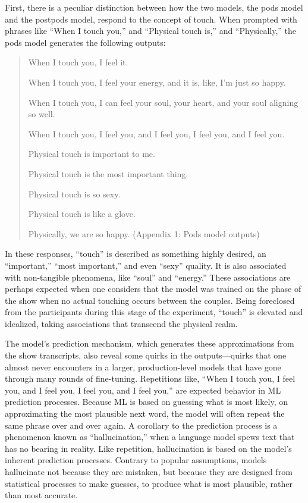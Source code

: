 \documentclass[11pt]{article}
\begin{document}
First, there is a peculiar distinction between how the two models, the
pods model and the postpods model, respond to the concept of touch.
When prompted with phrases like “When I touch you,” and “Physical
touch is,” and “Physically,” the pods model generates the following
outputs:

\begin{quote}
When I touch you, I feel it.

When I touch you, I feel your energy, and it is, like, I’m just so
happy.

When I touch you, I can feel your soul, your heart, and your soul
aligning so well.

When I touch you, I feel you, and I feel you, I feel you, and I feel
you.

Physical touch is important to me.

Physical touch is the most important thing.

Physical touch is so sexy.

Physical touch is like a glove.

Physically, we are so happy. (Appendix 1: Pods model outputs)
\end{quote}

In these responses, “touch” is described as something highly desired,
an “important,” “most important,” and even “sexy” quality. It is also
associated with non-tangible phenomena, like “soul” and “energy.”
These associations are perhaps expected when one considers that the
model was trained on the phase of the show when no actual touching
occurs between the couples. Being foreclosed from the participants
during this stage of the experiment, “touch” is elevated and
idealized, taking associations that transcend the physical realm.

The model’s prediction mechanism, which generates these approximations
from the show transcripts, also reveal some quirks in the
outputs—quirks that one almost never encounters in a larger,
production-level models that have gone through many rounds of
fine-tuning. Repetitions like, “When I touch you, I feel you, and I
feel you, I feel you, and I feel you,” are expected behavior in ML
prediction processes. Because ML is based on guessing what is most
likely, on approximating the most plausible next word, the model will
often repeat the same phrase over and over again. A corollary to the
prediction process is a phenomenon known as “hallucination,” when a
language model spews text that has no bearing in reality. Like
repetition, hallucination is based on the model’s inherent prediction
processes. Contrary to popular assumptions, models hallucinate not
because they are mistaken, but because they are designed from
statistical processes to make guesses, to produce what is most
plausible, rather than most accurate.
\end{document}
